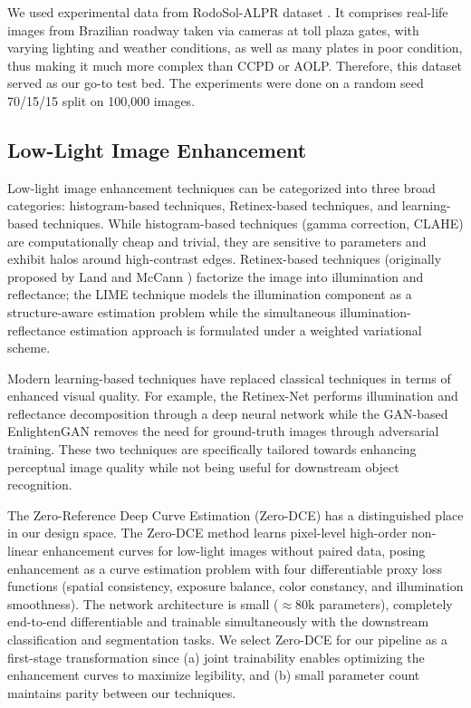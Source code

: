 \documentclass[preprint,12pt]{elsarticle}
\begin{document}
We used experimental data from RodoSol-ALPR dataset \cite{b6}. It comprises real-life images from Brazilian roadway taken via cameras at toll plaza gates, with varying lighting and weather conditions, as well as many plates in poor condition, thus making it much more complex than CCPD or AOLP. Therefore, this dataset served as our go-to test bed. The experiments were done on a random seed 70/15/15 split on 100,000 images.

\subsection{Low-Light Image Enhancement}
Low-light image enhancement techniques can be categorized into three broad categories: histogram-based techniques, Retinex-based techniques, and learning-based techniques. While histogram-based techniques (gamma correction, CLAHE) are computationally cheap and trivial, they are sensitive to parameters and exhibit halos around high-contrast edges. Retinex-based techniques (originally proposed by Land and McCann \cite{b17}) factorize the image into illumination and reflectance; the LIME technique \cite{b19} models the illumination component as a structure-aware estimation problem while the simultaneous illumination-reflectance estimation approach \cite{b18} is formulated under a weighted variational scheme.

Modern learning-based techniques have replaced classical techniques in terms of enhanced visual quality. For example, the Retinex-Net \cite{b21} performs illumination and reflectance decomposition through a deep neural network while the GAN-based EnlightenGAN \cite{b20} removes the need for ground-truth images through adversarial training. These two techniques are specifically tailored towards enhancing perceptual image quality while not being useful for downstream object recognition.

The Zero-Reference Deep Curve Estimation (Zero-DCE) \cite{b2} has a distinguished place in our design space. The Zero-DCE method learns pixel-level high-order non-linear enhancement curves for low-light images without paired data, posing enhancement as a curve estimation problem with four differentiable proxy loss functions (spatial consistency, exposure balance, color constancy, and illumination smoothness). The network architecture is small ($\approx 80$k parameters), completely end-to-end differentiable and trainable simultaneously with the downstream classification and segmentation tasks. We select Zero-DCE for our pipeline as a first-stage transformation since (a) joint trainability enables optimizing the enhancement curves to maximize legibility, and (b) small parameter count maintains parity between our techniques.
\end{document}
